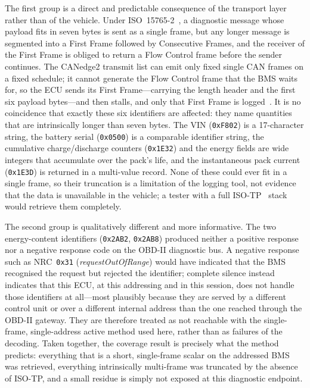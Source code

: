 \documentclass[11pt,a4paper,oneside,parskip=half]{scrreprt}
\providecommand{\hex}{}\renewcommand{\hex}[1]{\texttt{0x#1}}
\begin{document}
The first group is a direct and predictable consequence of the transport layer rather than of the vehicle. Under ISO~15765-2~\cite{iso15765}, a diagnostic message whose payload fits in seven bytes is sent as a single frame, but any longer message is segmented into a First Frame followed by Consecutive Frames, and the receiver of the First Frame is obliged to return a Flow Control frame before the sender continues. The CANedge2 transmit list can emit only fixed single CAN frames on a fixed schedule; it cannot generate the Flow Control frame that the BMS waits for, so the ECU sends its First Frame---carrying the length header and the first six payload bytes---and then stalls, and only that First Frame is logged~\cite{csselectronics_canedge2}. It is no coincidence that exactly these six identifiers are affected: they name quantities that are intrinsically longer than seven bytes. The VIN (\hex{F802}) is a 17-character string, the battery serial (\hex{0500}) is a comparable identifier string, the cumulative charge/discharge counters (\hex{1E32}) and the energy fields are wide integers that accumulate over the pack's life, and the instantaneous pack current (\hex{1E3D}) is returned in a multi-value record. None of these could ever fit in a single frame, so their truncation is a limitation of the logging tool, not evidence that the data is unavailable in the vehicle; a tester with a full ISO-TP~\cite{iso15765} stack would retrieve them completely.

The second group is qualitatively different and more informative. The two energy-content identifiers (\hex{2AB2}, \hex{2AB8}) produced neither a positive response nor a negative response code on the OBD-II diagnostic bus. A negative response such as NRC~\hex{31} (\emph{requestOutOfRange}) would have indicated that the BMS recognised the request but rejected the identifier; complete silence instead indicates that this ECU, at this addressing and in this session, does not handle those identifiers at all---most plausibly because they are served by a different control unit or over a different internal address than the one reached through the OBD-II gateway. They are therefore treated as not reachable with the single-frame, single-address active method used here, rather than as failures of the decoding. Taken together, the coverage result is precisely what the method predicts: everything that is a short, single-frame scalar on the addressed BMS was retrieved, everything intrinsically multi-frame was truncated by the absence of ISO-TP, and a small residue is simply not exposed at this diagnostic endpoint.
\end{document}
